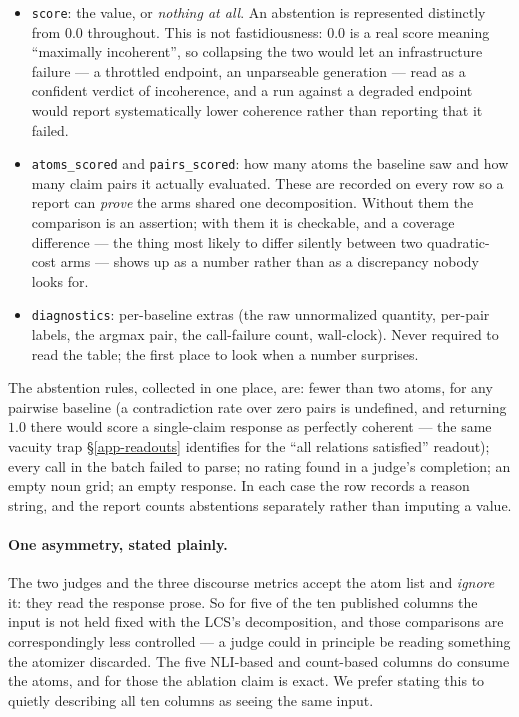 \begin{itemize}[leftmargin=1.4em,itemsep=2pt,topsep=3pt]
\item \texttt{score}: the value, or \emph{nothing at all}. An abstention is represented distinctly
  from $0.0$ throughout. This is not fastidiousness: $0.0$ is a real score meaning ``maximally
  incoherent'', so collapsing the two would let an infrastructure failure --- a throttled endpoint, an
  unparseable generation --- read as a confident verdict of incoherence, and a run against a degraded
  endpoint would report systematically lower coherence rather than reporting that it failed.
\item \texttt{atoms\_scored} and \texttt{pairs\_scored}: how many atoms the baseline saw and how many
  claim pairs it actually evaluated. These are recorded on every row so a report can \emph{prove} the
  arms shared one decomposition. Without them the comparison is an assertion; with them it is
  checkable, and a coverage difference --- the thing most likely to differ silently between two
  quadratic-cost arms --- shows up as a number rather than as a discrepancy nobody looks for.
\item \texttt{diagnostics}: per-baseline extras (the raw unnormalized quantity, per-pair labels, the
  argmax pair, the call-failure count, wall-clock). Never required to read the table; the first place
  to look when a number surprises.
\end{itemize}

The abstention rules, collected in one place, are: fewer than two atoms, for any pairwise baseline
(a contradiction rate over zero pairs is undefined, and returning $1.0$ there would score a
single-claim response as perfectly coherent --- the same vacuity trap \S\ref{app-readouts} identifies
for the ``all relations satisfied'' readout); every call in the batch failed to parse; no rating found
in a judge's completion; an empty noun grid; an empty response. In each case the row records a reason
string, and the report counts abstentions separately rather than imputing a value.

\paragraph{One asymmetry, stated plainly.} The two judges and the three discourse metrics accept the
atom list and \emph{ignore} it: they read the response prose. So for five of the ten published columns
the input is not held fixed with the LCS's decomposition, and those comparisons are correspondingly
less controlled --- a judge could in principle be reading something the atomizer discarded. The five
NLI-based and count-based columns do consume the atoms, and for those the ablation claim is exact. We
prefer stating this to quietly describing all ten columns as seeing the same input.


